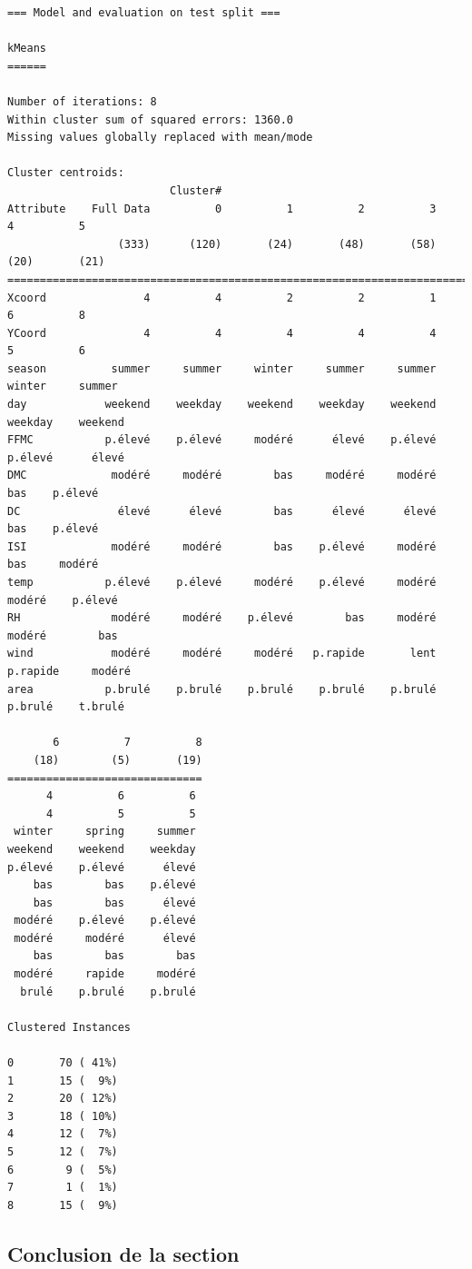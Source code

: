 \documentclass{article}
\begin{document}
\begin{sffamily}
\begin{center}
\begin{verbatim}
=== Model and evaluation on test split ===

kMeans
======

Number of iterations: 8
Within cluster sum of squared errors: 1360.0
Missing values globally replaced with mean/mode

Cluster centroids:
                         Cluster#
Attribute    Full Data          0          1          2          3          4          5
                 (333)      (120)       (24)       (48)       (58)       (20)       (21)
========================================================================================
Xcoord               4          4          2          2          1          6          8
YCoord               4          4          4          4          4          5          6
season          summer     summer     winter     summer     summer     winter     summer
day            weekend    weekday    weekend    weekday    weekend    weekday    weekend
FFMC           p.élevé    p.élevé     modéré      élevé    p.élevé    p.élevé      élevé
DMC             modéré     modéré        bas     modéré     modéré        bas    p.élevé
DC               élevé      élevé        bas      élevé      élevé        bas    p.élevé
ISI             modéré     modéré        bas    p.élevé     modéré        bas     modéré
temp           p.élevé    p.élevé     modéré    p.élevé     modéré     modéré    p.élevé
RH              modéré     modéré    p.élevé        bas     modéré     modéré        bas
wind            modéré     modéré     modéré   p.rapide       lent   p.rapide     modéré
area           p.brulé    p.brulé    p.brulé    p.brulé    p.brulé    p.brulé    t.brulé

       6          7          8
    (18)        (5)       (19)
==============================
      4          6          6
      4          5          5
 winter     spring     summer
weekend    weekend    weekday
p.élevé    p.élevé      élevé
    bas        bas    p.élevé
    bas        bas      élevé
 modéré    p.élevé    p.élevé
 modéré     modéré      élevé
    bas        bas        bas
 modéré     rapide     modéré
  brulé    p.brulé    p.brulé

Clustered Instances

0       70 ( 41%)
1       15 (  9%)
2       20 ( 12%)
3       18 ( 10%)
4       12 (  7%)
5       12 (  7%)
6        9 (  5%)
7        1 (  1%)
8       15 (  9%)
	\end{verbatim}
\end{center}

\subsection{Conclusion de la section}


\end{sffamily}
\end{document}
